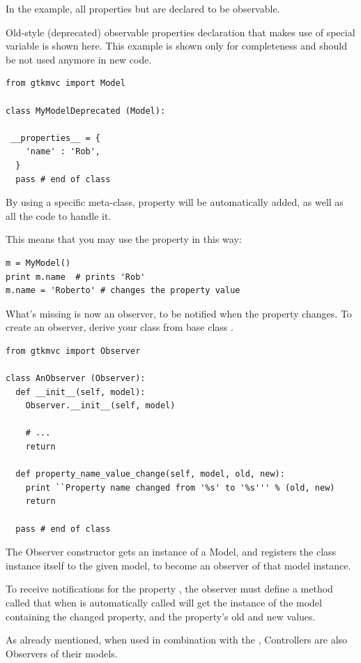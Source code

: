 In the example, all properties but  are declared
to be observable.

Old-style (deprecated) observable properties declaration that makes
use of special variable \OPvar is shown here. This example is shown
only for completeness and should be not used anymore in new code.

{ \codesize 
\begin{verbatim} 
from gtkmvc import Model

class MyModelDeprecated (Model):

 __properties__ = { 
    'name' : 'Rob',
  }
  pass # end of class
\end{verbatim}
}


By using a specific meta-class, property  will be
automatically added, as well as all the code to handle it.

This means that you may use the property in this way:
{ \codesize 
\begin{verbatim} 
m = MyModel()
print m.name  # prints 'Rob'
m.name = 'Roberto' # changes the property value
\end{verbatim}
}

What's missing is now an observer, to be notified when the property
changes. To create an observer, derive your class from base class
.

{ \codesize 
\begin{verbatim} 
from gtkmvc import Observer

class AnObserver (Observer):
  def __init__(self, model):
    Observer.__init__(self, model)

    # ...
    return

  def property_name_value_change(self, model, old, new):
    print ``Property name changed from '%s' to '%s''' % (old, new)
    return

  pass # end of class
\end{verbatim}
}

The Observer constructor gets an instance of a Model, and registers the
class instance itself to the given model, to become an observer of
that model instance.

To receive notifications for the property , the
observer must define a method called
 that when is automatically
called will get the instance of the model containing the changed
property, and the property's old and new values.

As already mentioned, when used in combination with the \mvc,
Controllers are also Observers of their models.

